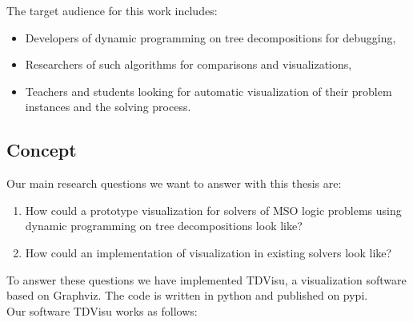 \documentclass[a4paper, 12pt, bibliography=totoc]{scrartcl}
\begin{document}
The target audience for this work includes: 
\begin{itemize}
	\item Developers of dynamic programming on tree decompositions for debugging,
	\item Researchers of such algorithms for comparisons and visualizations,
	\item Teachers and students looking for automatic visualization of their problem instances and the solving process.
\end{itemize} 




\subsection{Concept}

Our main research questions we want to answer with this thesis are:
\begin{enumerate}
	\item How could a prototype visualization for solvers of MSO logic problems using dynamic programming on tree decompositions look like?
	\item How could an implementation of visualization in existing solvers look like?
\end{enumerate}
\noindent
To answer these questions we have implemented TDVisu, a visualization software based on Graphviz. 
The code is written in python and published on pypi.\\

\noindent Our software TDVisu works as follows:
\end{document}
